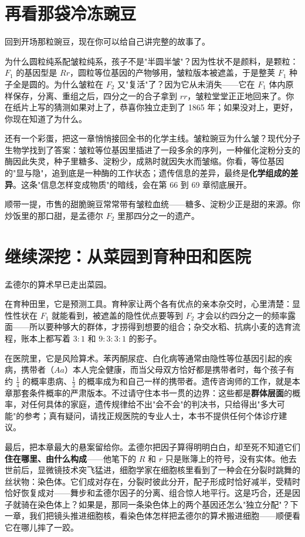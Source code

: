 \section{再看那袋冷冻豌豆}

回到开场那粒豌豆，现在你可以给自己讲完整的故事了。

为什么圆粒纯系配皱粒纯系，孩子不是"半圆半皱"？因为性状不是颜料，是颗粒：$F_1$ 的基因型是 $Rr$，圆粒等位基因的产物够用，皱粒版本被遮盖，于是整荚 $F_1$ 种子全是圆的。为什么皱粒在 $F_2$ 又"复活"了？因为它从未消失——它在 $F_1$ 体内原样保存，分离、重组之后，四分之一的合子拿到 $rr$，皱粒堂堂正正地回来了。你在纸片上写的猜测如果对上了，恭喜你独立走到了 1865 年；如果没对上，更好，你现在知道了为什么。

还有一个彩蛋，把这一章悄悄接回全书的化学主线。皱粒豌豆为什么皱？现代分子生物学找到了答案：皱粒等位基因里插进了一段多余的序列，一种催化淀粉分支的酶因此失灵，种子里糖多、淀粉少，成熟时就因失水而皱缩。你看，等位基因的"显与隐"，追到底是一种酶的工作状态；遗传信息的差异，最终是\textbf{化学组成的差异}。这条"信息怎样变成物质"的暗线，会在第 66 到 69 章彻底展开。

顺带一提，市售的甜脆豌豆常常带有皱粒血统——糖多、淀粉少正是甜的来源。你炒饭里的那口甜，是孟德尔 $F_2$ 里那四分之一的遗产。

\section{继续深挖：从菜园到育种田和医院}

孟德尔的算术早已走出菜园。

在育种田里，它是预测工具。育种家让两个各有优点的亲本杂交时，心里清楚：显性性状在 $F_1$ 就能看到，被遮盖的隐性优点要等到 $F_2$ 才会以约四分之一的频率露面——所以要种够大的群体，才捞得到想要的组合；杂交水稻、抗病小麦的选育流程，账本上都写着 $3:1$ 和 $9:3:3:1$ 的影子。

在医院里，它是风险算术。苯丙酮尿症、白化病等通常由隐性等位基因引起的疾病，携带者（$Aa$）本人完全健康，而当父母双方恰好都是携带者时，每个孩子有约 $\frac{1}{4}$ 的概率患病、$\frac{1}{2}$ 的概率成为和自己一样的携带者。遗传咨询师的工作，就是本章那套条件概率的严肃版本。不过请守住本书一贯的边界：这些都是\textbf{群体层面}的概率，对任何具体的家庭，遗传规律给不出"会不会"的判决书，只给得出"多大可能"的参考；真有疑问，请找正规医院的专业人士，本书不提供任何个体诊疗建议。

最后，把本章最大的悬案留给你。孟德尔把因子算得明明白白，却至死不知道它们\textbf{住在哪里、由什么构成}——他笔下的 $R$ 和 $r$ 只是账簿上的符号，没有实体。他去世前后，显微镜技术突飞猛进，细胞学家在细胞核里看到了一种会在分裂时跳舞的丝状物：染色体。它们成对存在，分裂时彼此分开，配子形成时恰好减半，受精时恰好恢复成对——舞步和孟德尔因子的分离、组合惊人地平行。这是巧合，还是因子就骑在染色体上？如果是，那同一条染色体上的两个基因还怎么"独立分配"？下一章，我们把镜头推进细胞核，看染色体怎样把孟德尔的算术搬进细胞——顺便看它在哪儿摔了一跤。

